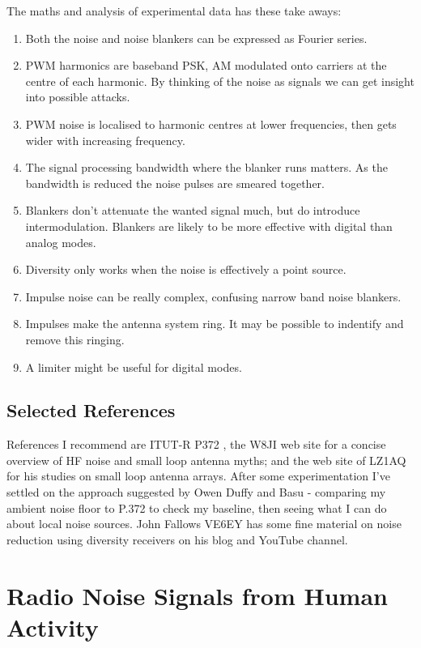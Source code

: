 \documentclass{article}
\begin{document}
The maths and analysis of experimental data has these take aways:
\begin{enumerate}
\item Both the noise and noise blankers can be expressed as Fourier series.
\item PWM harmonics are baseband PSK, AM modulated onto carriers at the centre of each harmonic.  By thinking of the noise as signals we can get insight into possible attacks.
\item PWM noise is localised to harmonic centres at lower frequencies, then gets wider with increasing frequency.
\item The signal processing bandwidth where the blanker runs matters.  As the bandwidth is reduced the noise pulses are smeared together.
\item Blankers don't attenuate the wanted signal much, but do introduce intermodulation.  Blankers are likely to be more effective with digital than analog modes.
\item Diversity only works when the noise is effectively a point source.
\item Impulse noise can be really complex, confusing narrow band noise blankers.
\item Impulses make the antenna system ring. It may be possible to indentify and remove this ringing.
\item A limiter might be useful for digital modes.
\end{enumerate}

\subsection{Selected References}

References I recommend are ITUT-R P372 \cite{itu372-16}, the W8JI web site \cite{w8ji_radio_noise} for a concise overview of HF noise and small loop antenna myths; and the web site of LZ1AQ \cite{lz1aq} for his studies on small loop antenna arrays. After some experimentation \cite{rowetel_noise_city} I've settled on the approach suggested by Owen Duffy \cite{duffy_lig} and Basu \cite{vu2nsb_s_meter} - comparing my ambient noise floor to P.372 to check my baseline, then seeing what I can do about local noise sources. John Fallows VE6EY \cite{ve6ey} has some fine material on noise reduction using diversity receivers on his blog and YouTube channel.

\section{Radio Noise Signals from Human Activity}
\end{document}
